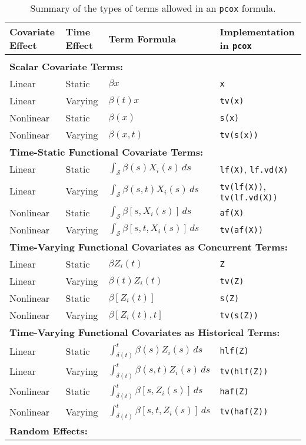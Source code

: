 \documentclass[12pt]{article}
\begin{document}
\begin{table}[t]
\centering
\caption{Summary of the types of terms allowed in an \texttt{pcox} formula.\label{tab:terms}}
\begin{tabular}{llll}
\bf Covariate Effect & \bf Time Effect & \bf Term Formula & \bf Implementation in \texttt{pcox}  \\[1ex]
\hline \\[-1.5ex]
\multicolumn{4}{l}{\bf Scalar Covariate Terms:} \\
Linear	& Static	& $\beta x$	& \texttt{x} \\
Linear	& Varying	& $\beta(t) x$	& \texttt{tv(x)} \\
Nonlinear	& Static	& $\beta(x)$	& \texttt{s(x)} \\
Nonlinear	& Varying	& $\beta(x,t)$	& \texttt{tv(s(x))} \\[2ex]
\multicolumn{4}{l}{\bf Time-Static Functional Covariate Terms:} \\
Linear	& Static	& $\int_{\mathcal{S}} \beta(s)X_i(s)\,ds$		& \texttt{lf(X)}, \texttt{lf.vd(X)} \\
Linear	& Varying	& $\int_{\mathcal{S}} \beta(s,t)X_i(s)\,ds$	& \texttt{tv(lf(X))}, \texttt{tv(lf.vd(X))} \\
Nonlinear	& Static	& $\int_{\mathcal{S}} \beta[s,X_i(s)]\,ds$		& \texttt{af(X)}\\
Nonlinear	& Varying	& $\int_{\mathcal{S}} \beta[s,t,X_i(s)]\, ds$	& \texttt{tv(af(X))} \\[2ex]
\multicolumn{4}{l}{\bf Time-Varying Functional Covariates as Concurrent Terms:} \\
Linear	& Static	& $\beta Z_i(t)$		& \texttt{Z} \\
Linear	& Varying	& $\beta(t) Z_i(t)$	& \texttt{tv(Z)} \\
Nonlinear	& Static	& $\beta[Z_i(t)]$		& \texttt{s(Z)} \\
Nonlinear	& Varying	& $\beta[Z_i(t), t]$		& \texttt{tv(s(Z))} \\[2ex]
\multicolumn{4}{l}{\bf Time-Varying Functional Covariates as Historical Terms:} \\
Linear	& Static	& $\int_{\delta(t)}^t \beta(s)Z_i(s)\,ds$	& \texttt{hlf(Z)} \\
Linear	& Varying	& $\int_{\delta(t)}^t \beta(s,t)Z_i(s)\,ds$	& \texttt{tv(hlf(Z))} \\
Nonlinear	& Static	& $\int_{\delta(t)}^t \beta[s, Z_i(s)]\,ds$	& \texttt{haf(Z)} \\
Nonlinear	& Varying	& $\int_{\delta(t)}^t \beta[s, t, Z_i(s)]\,ds$	& \texttt{tv(haf(Z))} \\[2ex]
\multicolumn{4}{l}{\bf Random Effects:} \\
\end{tabular}
\end{table}
\end{document}
